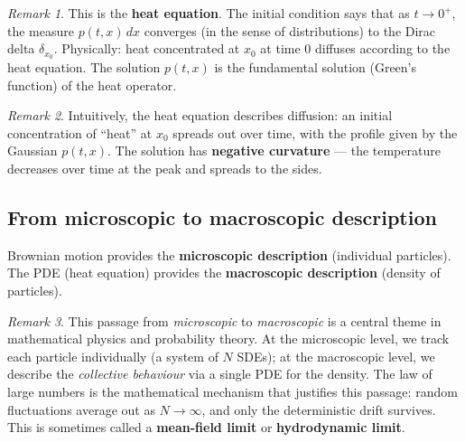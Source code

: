 \documentclass[11pt]{article}
\theoremstyle{definition}
\theoremstyle{remark}
\newtheorem{remark}{Remark}
\begin{document}
\begin{remark}
This is the \textbf{heat equation}.
The initial condition says that as $t \to 0^+$,
the measure $p(t, x)\,dx$ converges (in the sense of
distributions) to the Dirac delta $\delta_{x_0}$.
Physically: heat concentrated at $x_0$ at time $0$
diffuses according to the heat equation.
The solution $p(t,x)$ is the fundamental solution
(Green's function) of the heat operator.
\end{remark}

\begin{remark}
Intuitively, the heat equation describes diffusion:
an initial concentration of ``heat'' at $x_0$ spreads
out over time, with the profile given by the Gaussian
$p(t,x)$.  The solution has \textbf{negative curvature}
--- the temperature decreases over time at the peak
and spreads to the sides.
\end{remark}

\subsection*{From microscopic to macroscopic description}


Brownian motion provides the \textbf{microscopic description}
(individual particles).
The PDE (heat equation) provides the \textbf{macroscopic description}
(density of particles).

\begin{remark}
This passage from \emph{microscopic} to \emph{macroscopic} is a
central theme in mathematical physics and probability theory.
At the microscopic level, we track each particle individually
(a system of $N$ SDEs); at the macroscopic level, we describe
the \emph{collective behaviour} via a single PDE for the density.
The law of large numbers is the mathematical mechanism that
justifies this passage: random fluctuations average out as
$N \to \infty$, and only the deterministic drift survives.
This is sometimes called a \textbf{mean-field limit} or
\textbf{hydrodynamic limit}.
\end{remark}

\end{document}
